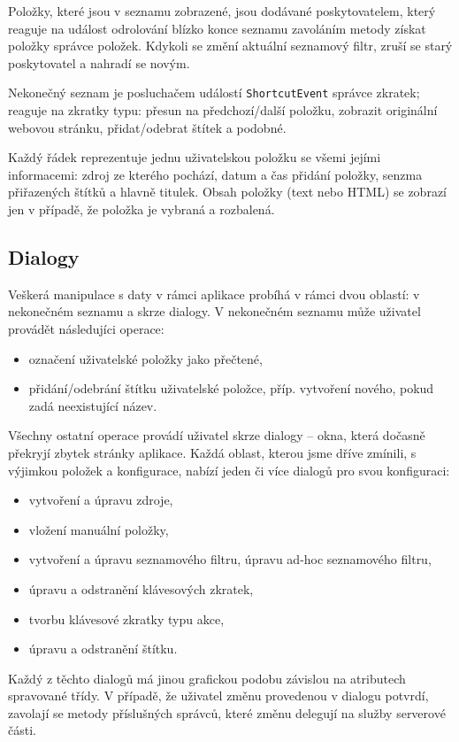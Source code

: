 Položky, které jsou v seznamu zobrazené, jsou dodávané poskytovatelem, který reaguje na událost odrolování blízko konce seznamu zavoláním metody získat položky správce položek.
Kdykoli se změní aktuální seznamový filtr, zruší se starý poskytovatel a nahradí se novým.

Nekonečný seznam je posluchačem událostí \verb|ShortcutEvent| správce zkratek; reaguje na zkratky typu: přesun na předchozí/další položku, zobrazit originální webovou stránku, přidat/odebrat štítek a podobné.

Každý řádek reprezentuje jednu uživatelskou položku se všemi jejími informacemi: zdroj ze kterého pochází, datum a čas přidání položky, senzma přiřazených štítků a hlavně titulek.
Obsah položky (text nebo HTML) se zobrazí jen v případě, že položka je vybraná a rozbalená.

\subsection{Dialogy}
Veškerá manipulace s daty v rámci aplikace probíhá v rámci dvou oblastí: v nekonečném seznamu a skrze dialogy.
V nekonečném seznamu může uživatel provádět následujíci operace:
\begin{itemize}
	\item označení uživatelské položky jako přečtené,
	\item přidání/odebrání štítku uživatelské položce, příp. vytvoření nového, pokud zadá neexistující název.
\end{itemize}

Všechny ostatní operace provádí uživatel skrze dialogy -- okna, která dočasně překryjí zbytek stránky aplikace.
Každá oblast, kterou jsme dříve zmínili, s výjimkou položek a konfigurace, nabízí jeden či více dialogů pro svou konfiguraci:
\begin{itemize}
	\item vytvoření a úpravu zdroje,
	\item vložení manuální položky,
	\item vytvoření a úpravu seznamového filtru, úpravu ad-hoc seznamového filtru,
	\item úpravu a odstranění klávesových zkratek,
	\item tvorbu klávesové zkratky typu akce,
	\item úpravu a odstranění štítku.
\end{itemize}

Každý z těchto dialogů má jinou grafickou podobu závislou na atributech spravované třídy.
V případě, že uživatel změnu provedenou v dialogu potvrdí, zavolají se metody příslušných správců, které změnu delegují na služby serverové části.

